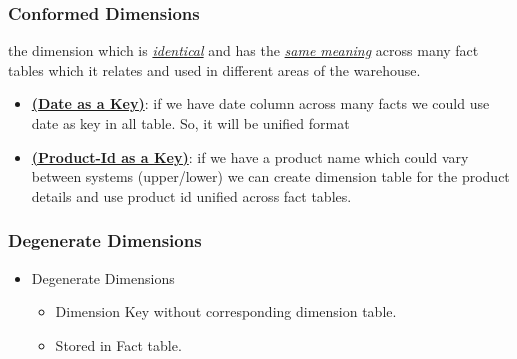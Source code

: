 \begin{frame}
    \frametitle{Conformed Dimensions}
    \begin{description}[<+->]
        \item[Conformed Dimensions]    the dimension which is \underline{\textit{identical}} and has the \underline{\textit{same meaning}} across many fact tables which it relates and used in different areas of the warehouse.
        \begin{example}
            \begin{itemize}[<+->]
                \item \underline{\textbf{(Date as a Key)}}: if we have date column across many facts we could use date as key in all table.
                So, it will be unified format
                \item \underline{\textbf{(Product-Id as a Key)}}: if we have a product name which could vary between systems
                \faEdit \space \faArrowCircleORight \space (upper/lower) we can create dimension table for the product details and use product id unified across fact tables.
            \end{itemize}
        \end{example}
    \end{description}
\end{frame}
\begin{frame}
	\frametitle{Degenerate Dimensions}
	\begin{itemize}[<+->]
		\item Degenerate Dimensions
		\begin{itemize}[<+->]
			\item Dimension Key without corresponding dimension table.%
			\item Stored in Fact table.
		\end{itemize}
	\end{itemize}
\end{frame}
